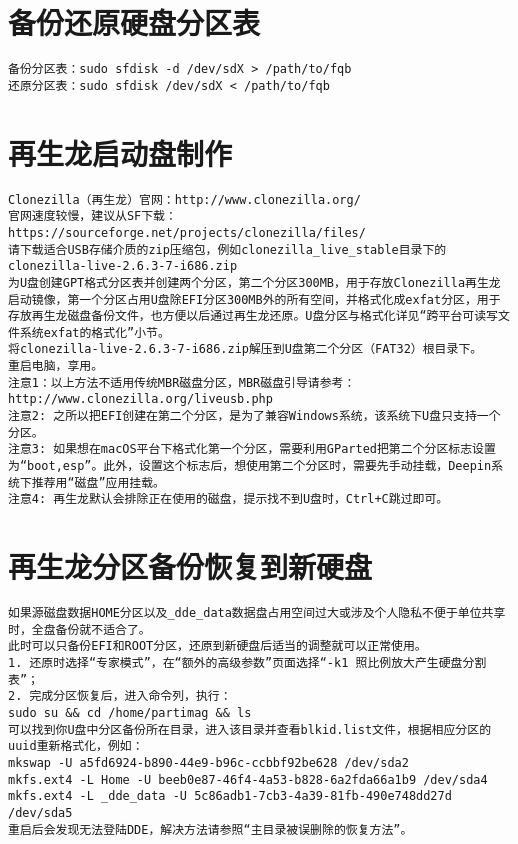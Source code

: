 \documentclass[a4paper,fontset=fandol,zihao=-4,linespread=1.2]{ctexbook}
\begin{document}
\section{备份还原硬盘分区表}
\begin{lstlisting}
备份分区表：sudo sfdisk -d /dev/sdX > /path/to/fqb
还原分区表：sudo sfdisk /dev/sdX < /path/to/fqb
\end{lstlisting}

\section{再生龙启动盘制作}
\begin{lstlisting}
Clonezilla（再生龙）官网：http://www.clonezilla.org/
官网速度较慢，建议从SF下载：https://sourceforge.net/projects/clonezilla/files/
请下载适合USB存储介质的zip压缩包，例如clonezilla_live_stable目录下的clonezilla-live-2.6.3-7-i686.zip
为U盘创建GPT格式分区表并创建两个分区，第二个分区300MB，用于存放Clonezilla再生龙启动镜像，第一个分区占用U盘除EFI分区300MB外的所有空间，并格式化成exfat分区，用于存放再生龙磁盘备份文件，也方便以后通过再生龙还原。U盘分区与格式化详见“跨平台可读写文件系统exfat的格式化”小节。
将clonezilla-live-2.6.3-7-i686.zip解压到U盘第二个分区（FAT32）根目录下。
重启电脑，享用。
注意1：以上方法不适用传统MBR磁盘分区，MBR磁盘引导请参考：http://www.clonezilla.org/liveusb.php
注意2: 之所以把EFI创建在第二个分区，是为了兼容Windows系统，该系统下U盘只支持一个分区。
注意3: 如果想在macOS平台下格式化第一个分区，需要利用GParted把第二个分区标志设置为“boot,esp”。此外，设置这个标志后，想使用第二个分区时，需要先手动挂载，Deepin系统下推荐用“磁盘”应用挂载。
注意4: 再生龙默认会排除正在使用的磁盘，提示找不到U盘时，Ctrl+C跳过即可。
\end{lstlisting}

\section{再生龙分区备份恢复到新硬盘}
\begin{lstlisting}
如果源磁盘数据HOME分区以及_dde_data数据盘占用空间过大或涉及个人隐私不便于单位共享时，全盘备份就不适合了。
此时可以只备份EFI和ROOT分区，还原到新硬盘后适当的调整就可以正常使用。
1. 还原时选择“专家模式”，在“额外的高级参数”页面选择“-k1 照比例放大产生硬盘分割表”；
2. 完成分区恢复后，进入命令列，执行：
sudo su && cd /home/partimag && ls
可以找到你U盘中分区备份所在目录，进入该目录并查看blkid.list文件，根据相应分区的uuid重新格式化，例如：
mkswap -U a5fd6924-b890-44e9-b96c-ccbbf92be628 /dev/sda2
mkfs.ext4 -L Home -U beeb0e87-46f4-4a53-b828-6a2fda66a1b9 /dev/sda4
mkfs.ext4 -L _dde_data -U 5c86adb1-7cb3-4a39-81fb-490e748dd27d /dev/sda5
重启后会发现无法登陆DDE，解决方法请参照“主目录被误删除的恢复方法”。
\end{lstlisting}
\end{document}
